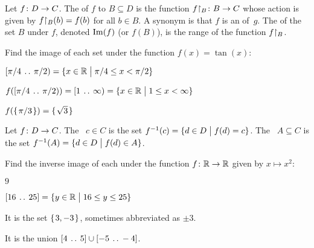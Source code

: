 \documentclass{ibl}  %
\begin{document}
\begin{df}
Let $\mbox{$f\colon D\to C$}$.
The  of $f$ to $B\subseteq D$ is
the function $\mbox{${f}\mathord\upharpoonright_{B}\colon B\to C$}$ whose action is given by 
${f}\mathord\upharpoonright_{B}(b)=f(b)$ for all $b\in B$.
A synonym is that
$f$ is an  of~$g$.
The  of the set $B$ under $f$, 
denoted $\operatorname{Im}(f)$ (or $f(B)$),
is the range of the function ${f}\mathord\upharpoonright_{B}$.
\end{df}

\begin{ex}
Find the image of each set under the function $f(x)=\tan(x)$:
\begin{items}
\item $[\pi/4\:\mathinner{\ldotp\ldotp}\:\pi/2)=\{x\in\mathbb{R} \bigm| \pi/4\leq x<\pi/2\}$
\item {}
\end{items}
\begin{ans}
\begin{items}
\item $f([\pi/4\:\mathinner{\ldotp\ldotp}\:\pi/2))=[1\:\mathinner{\ldotp\ldotp}\:\infty)
             =\{x\in\mathbb{R} \bigm| 1\leq x<\infty\}$ 
\item $f(\mbox{$\{\hspace{0.1em}\pi/3\hspace{0.1em}\}$})=\mbox{$\{\hspace{0.1em}\sqrt{3}\hspace{0.1em}\}$}$
\end{items}
\end{ans}
\end{ex}

\begin{df}
Let $\mbox{$f\colon D\to C$}$.
The ~$c\in C$ is
the set $f^{-1}(c)=\{d\in D \bigm| f(d)=c\}$.
The ~$A\subseteq C$
is the set $f^{-1}(A)=\{d\in D \bigm| f(d)\in A\}$.   
\end{df}

\begin{ex}
Find the inverse image of each under the function $\mbox{$f\colon \mathbb{R}\to \mathbb{R}$}$ 
given by $x\mapsto x^2$:
\begin{items}
\item $9$
\item $[16\:\mathinner{\ldotp\ldotp}\:25]=\{y\in\mathbb{R} \bigm| 16\leq y\leq 25\}$
\end{items}
\begin{ans}
\begin{items}
\item It is the set $\mbox{$\{\hspace{0.1em}3,-3\hspace{0.1em}\}$}$, sometimes abbreviated as $\pm 3$.
\item It is the union $[4\:\mathinner{\ldotp\ldotp}\:5]\cup [-5\:\mathinner{\ldotp\ldotp}\:-4]$.    
\end{items}
\end{ans}
\end{ex}
\end{document}
